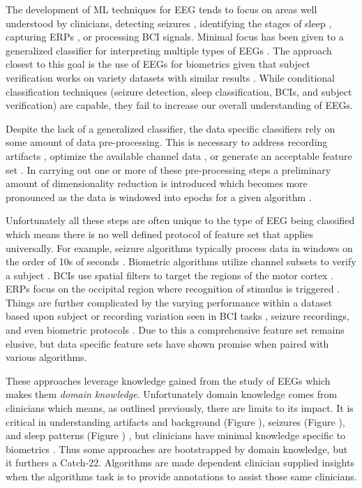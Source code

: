 The development of \ac{ML} techniques for \ac{EEG} tends to focus on areas well understood by clinicians, detecting seizures \cite{Chu2017,Wulsin2011}, identifying the stages of sleep \cite{Schluter2012,Hassan2016}, capturing \acp{ERP} \cite{Makeig2012,Guntekin2016}, or processing \ac{BCI} signals. Minimal focus has been given to a generalized classifier for interpreting multiple types of \acp{EEG} \cite{Vidaurre2011}. The approach closest to this goal is the use of \acp{EEG} for biometrics given that subject verification works on variety datasets with similar results \cite{Paranjape2001,Palaniappan2007a,Yang2016}. While conditional classification techniques (seizure detection, sleep classification, \acp{BCI}, and subject verification) are capable, they fail to increase our overall understanding of \acp{EEG}.

Despite the lack of a generalized classifier, the data specific classifiers rely on some amount of data pre-processing. This is necessary to address recording artifacts \cite{Lawhern2016,Mahajan2015,Minguillon2017}, optimize the available channel data \cite{Rocca2014}, or generate an acceptable feature set \cite{Su2018}.  In carrying out one or more of these pre-processing steps a preliminary amount of dimensionality reduction is introduced which becomes more pronounced as the data is windowed into epochs for a given algorithm \cite{Gross2014,Lotte2007b,Subasi2010}. 

Unfortunately all these steps are often unique to the type of \ac{EEG} being classified which means there is no well defined protocol of feature set that applies universally. For example, seizure algorithms typically process data in windows on the order of 10s of seconds \cite{Wang2016}. Biometric algorithms utilize channel subsets to verify a subject \cite{Campisi2014}. \acp{BCI} use spatial filters to target the regions of the motor cortex \cite{Schalk2004}. \acp{ERP} focus on the occipital region where recognition of stimulus is triggered \cite{Kindermans2014b}. Things are further complicated by the varying performance within a dataset based upon subject or recording variation seen in \ac{BCI} tasks \cite{Gross2014,Blankertz2007a,Kang2014b}, seizure recordings\cite{Ramgopal2014,Wulsin2011,Page2015}, and even biometric protocols \cite{Armstrong2015,Maiorana2016}. Due to this a comprehensive feature set remains elusive, but data specific feature sets have shown promise when paired with various algorithms.

These approaches leverage knowledge gained from the study of \acp{EEG} which makes them \emph{domain knowledge}. Unfortunately domain knowledge comes from clinicians which means, as outlined previously, there are limits to its impact. It is critical in understanding artifacts and background (Figure ), seizures (Figure ), and sleep patterns (Figure ) \cite{Bodizs2009,Wendt2012}, but clinicians have minimal knowledge specific to biometrics \cite{Paranjape2001}. Thus some approaches are bootstrapped by domain knowledge, but it furthers a Catch-22. Algorithms are made dependent clinician supplied insights when the algorithms task is to provide annotations to assist those same clinicians.

